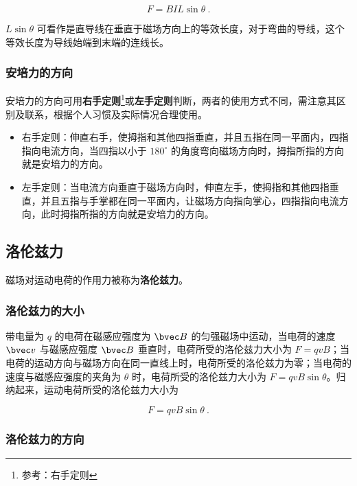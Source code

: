 \begin{equation}
F=BIL\sin\theta~.
\end{equation}

$L\sin\theta$ 可看作是直导线在垂直于磁场方向上的等效长度，对于弯曲的导线，这个等效长度为导线始端到末端的连线长。

\subsubsection{安培力的方向}

安培力的方向可用\textbf{右手定则}\footnote{参考：右手定则}或\textbf{左手定则}判断，两者的使用方式不同，需注意其区别及联系，根据个人习惯及实际情况合理使用。

\begin{itemize}
\item 右手定则：伸直右手，使拇指和其他四指垂直，并且五指在同一平面内，四指指向电流方向，当四指以小于 $180^\circ$ 的角度弯向磁场方向时，拇指所指的方向就是安培力的方向。
\item 左手定则：当电流方向垂直于磁场方向时，伸直左手，使拇指和其他四指垂直，并且五指与手掌都在同一平面内，让磁场方向指向掌心，四指指向电流方向，此时拇指所指的方向就是安培力的方向。
\end{itemize}

\subsection{洛伦兹力}

磁场对运动电荷的作用力被称为\textbf{洛伦兹力}。

\subsubsection{洛伦兹力的大小}

带电量为 $q$ 的电荷在磁感应强度为 $\bvec B$ 的匀强磁场中运动，当电荷的速度 $\bvec v$ 与磁感应强度 $\bvec B$ 垂直时，电荷所受的洛伦兹力大小为 $F=qvB$；当电荷的运动方向与磁场方向在同一直线上时，电荷所受的洛伦兹力为零；当电荷的速度与磁感应强度的夹角为 $\theta$ 时，电荷所受的洛伦兹力大小为 $F=qvB\sin\theta$。归纳起来，运动电荷所受的洛伦兹力大小为

\begin{equation}
F=qvB\sin\theta~.
\end{equation}

\subsubsection{洛伦兹力的方向}

